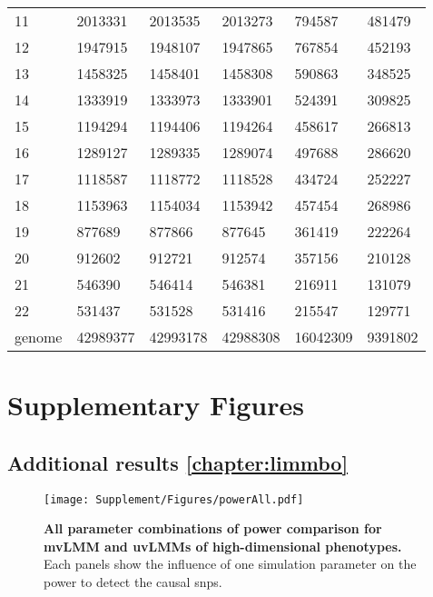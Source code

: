 \begin{table}[htbp]
\begin{tabular}{llllll}
    \num{11} & \num{2013331} & \num{2013535} & \num{2013273} & \num{794587} & \num{481479} \\
    \num{12} & \num{1947915} & \num{1948107} & \num{1947865} & \num{767854} & \num{452193} \\
    \num{13} & \num{1458325} & \num{1458401} & \num{1458308} & \num{590863} & \num{348525} \\
    \num{14} & \num{1333919} & \num{1333973} & \num{1333901} & \num{524391} & \num{309825} \\
    \num{15} & \num{1194294} & \num{1194406} & \num{1194264} & \num{458617} & \num{266813} \\
    \num{16} & \num{1289127} & \num{1289335} & \num{1289074} & \num{497688} & \num{286620} \\
    \num{17} & \num{1118587} & \num{1118772} & \num{1118528} & \num{434724} & \num{252227} \\
    \num{18} & \num{1153963} & \num{1154034} & \num{1153942} & \num{457454} & \num{268986} \\
    \num{19} & \num{877689} & \num{877866} & \num{877645} & \num{361419} & \num{222264} \\
    \num{20} & \num{912602} & \num{912721} & \num{912574} & \num{357156} & \num{210128} \\
    \num{21} & \num{546390} & \num{546414} & \num{546381} & \num{216911} & \num{131079} \\
    \num{22} & \num{531437} & \num{531528} & \num{531416} & \num{215547} & \num{129771} \\
    \midrule
    genome & \num{42989377} & \num{42993178} & \num{42988308} & \num{16042309} & \num{9391802} \\
    \bottomrule
    \end{tabular}%
  \label{tab:imputationQC}%
\end{table}%


\chapter{Supplementary Figures}
\newpage
\section{Additional results \cref{chapter:limmbo}}
\begin{figure}[hbtp]
	\centering
	\texttt{[image: Supplement/Figures/powerAll.pdf]}
		\caption[\textbf{All parameter combinations of power comparison for mvLMM and uvLMMs of high-dimensional phenotypes.}]{\textbf{All parameter combinations of power comparison for mvLMM and uvLMMs of high-dimensional phenotypes.} Each panels show the influence of one simulation parameter on the power to detect the causal \glspl{snp}.} 
	 	\label{fig:power-all}
\end{figure}

